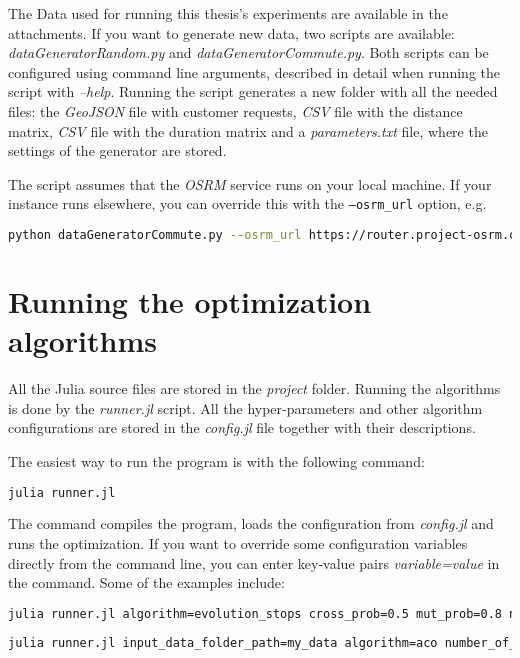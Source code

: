 The Data used for running this thesis's experiments are available in the attachments. If you want to generate new data, two scripts are available: \textit{dataGeneratorRandom.py} and \textit{dataGeneratorCommute.py}. Both scripts can be configured using command line arguments, described in detail when running the script with \textit{--help}. Running the script generates a new folder with all the needed files: the \textit{GeoJSON} file with customer requests, \textit{CSV} file with the distance matrix, \textit{CSV} file with the duration matrix and a \textit{parameters.txt} file, where the settings of the generator are stored.

The script assumes that the \textit{OSRM} service runs on your local machine. If your instance runs elsewhere, you can override this with the \texttt{--osrm\_url} option, e.g.

\begin{lstlisting}[language=bash, breaklines=true]
    python dataGeneratorCommute.py --osrm_url https://router.project-osrm.org
\end{lstlisting}

\section{Running the optimization algorithms}

All the Julia source files are stored in the \textit{project} folder. Running the algorithms is done by the \textit{runner.jl} script. All the hyper-parameters and other algorithm configurations are stored in the \textit{config.jl} file together with their descriptions.

The easiest way to run the program is with the following command:
\begin{lstlisting}[language=bash]
    julia runner.jl
\end{lstlisting}

The command compiles the program, loads the configuration from \textit{config.jl} and runs the optimization. If you want to override some configuration variables directly from the command line, you can enter key-value pairs \textit{variable=value} in the command. Some of the examples include:

\begin{lstlisting}[language=bash, breaklines=true]
    julia runner.jl algorithm=evolution_stops cross_prob=0.5 mut_prob=0.8 num_generations=20000
\end{lstlisting}

\begin{lstlisting}[language=bash, breaklines=true]
    julia runner.jl input_data_folder_path=my_data algorithm=aco number_of_runs=10 num_ants=10 num_iterations=10000
\end{lstlisting}

